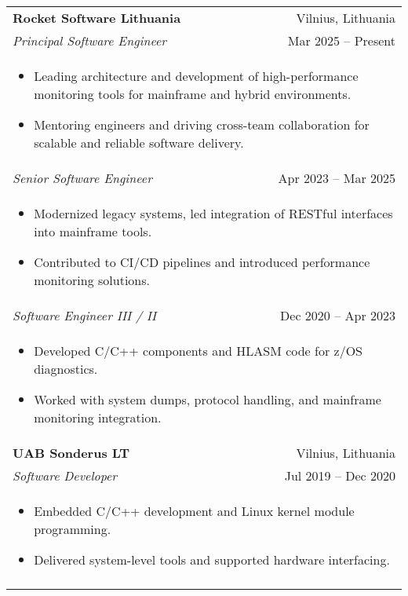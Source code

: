 \begin{tabularx}{\textwidth}{Xr}
\textbf{Rocket Software Lithuania} & Vilnius, Lithuania \\
\textit{Principal Software Engineer} & Mar 2025 -- Present \\
\multicolumn{2}{l}{\begin{itemize}[leftmargin=*]
  \item Leading architecture and development of high-performance monitoring tools for mainframe and hybrid environments.
  \item Mentoring engineers and driving cross-team collaboration for scalable and reliable software delivery.
\end{itemize}} \\

\textit{Senior Software Engineer} & Apr 2023 -- Mar 2025 \\
\multicolumn{2}{l}{\begin{itemize}[leftmargin=*]
  \item Modernized legacy systems, led integration of RESTful interfaces into mainframe tools.
  \item Contributed to CI/CD pipelines and introduced performance monitoring solutions.
\end{itemize}} \\

\textit{Software Engineer III / II} & Dec 2020 -- Apr 2023 \\
\multicolumn{2}{l}{\begin{itemize}[leftmargin=*]
  \item Developed C/C++ components and HLASM code for z/OS diagnostics.
  \item Worked with system dumps, protocol handling, and mainframe monitoring integration.
\end{itemize}} \\
\addlinespace

\textbf{UAB Sonderus LT} & Vilnius, Lithuania \\
\textit{Software Developer} & Jul 2019 -- Dec 2020 \\
\multicolumn{2}{l}{\begin{itemize}[leftmargin=*]
  \item Embedded C/C++ development and Linux kernel module programming.
  \item Delivered system-level tools and supported hardware interfacing.
\end{itemize}} \\
\addlinespace


\end{tabularx}
